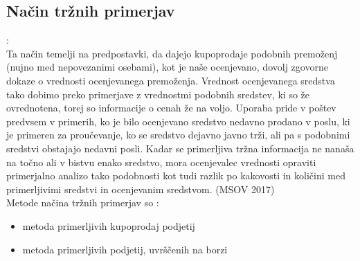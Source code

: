 \documentclass[12pt,a4paper]{amsart}
\theoremstyle{definition} %
\theoremstyle{plain} %
\begin{document}
\subsection{Način tržnih primerjav}:\\
Ta način temelji na predpostavki, da dajejo kupoprodaje podobnih premoženj (nujno med nepovezanimi osebami), kot je naše ocenjevano, dovolj zgovorne dokaze o vrednosti ocenjevanega premoženja. 
Vrednost ocenjevanega sredstva tako dobimo preko primerjave z vrednostmi podobnih sredstev, ki so že ovrednotena, torej so informacije o cenah že na voljo. Uporaba pride v poštev predvsem v primerih, ko je bilo ocenjevano sredstvo nedavno prodano v poslu, ki je primeren za proučevanje, ko se sredstvo dejavno javno trži, ali pa s podobnimi sredstvi obstajajo nedavni posli. Kadar se primerljiva tržna informacija ne nanaša na točno ali v bistvu enako sredstvo, mora ocenjevalec vrednosti opraviti primerjalno analizo tako podobnosti kot tudi razlik po kakovosti in količini med primerljivimi sredstvi in ocenjevanim sredstvom. (MSOV 2017) \\

Metode načina tržnih primerjav so :
\begin{itemize}
\item metoda primerljivih kupoprodaj podjetij
\item metoda primerljivih podjetij, uvrščenih na borzi
\end{itemize}
\end{document}
